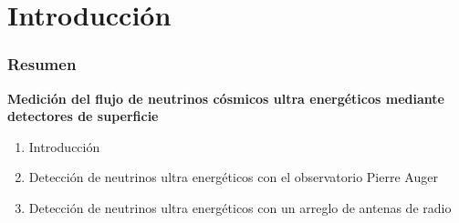 \section{Introducci\'on}

\begin{frame}
 \frametitle{Resumen}
 \begin{exampleblock}{
  \begin{center}
	\textbf{Medici\'on del flujo de neutrinos c\'osmicos ultra energ\'eticos mediante detectores de superficie}
  \end{center}
  }
  \begin{enumerate}\setlength\itemsep{3mm}
   \item Introducci\'on
   \item Detecci\'on de neutrinos ultra energ\'eticos con el observatorio Pierre Auger
   \item Detecci\'on de neutrinos ultra energ\'eticos con un arreglo de antenas de radio
  \end{enumerate}

 \end{exampleblock}
\end{frame}

